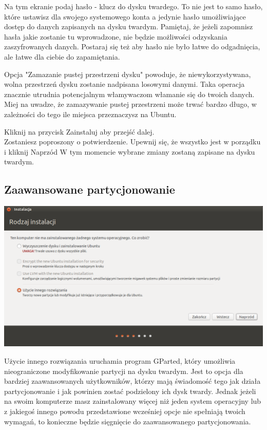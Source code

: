 Na tym ekranie podaj hasło - klucz do dysku twardego. To nie jest to samo hasło, które ustawisz dla swojego systemowego konta a jedynie hasło umożliwiające dostęp do danych zapisanych na dysku twardym. Pamiętaj, że jeżeli zapomnisz hasła jakie zostanie tu wprowadzone, nie będzie możliwości odzyskania zaszyfrowanych danych. Postaraj się też aby hasło nie było łatwe do odgadnięcia, ale łatwe dla ciebie do zapamiętania.

Opcja "Zamazanie pustej przestrzeni dysku" powoduje, że niewykorzystywana, wolna przestrzeń dysku zostanie nadpisana losowymi danymi. Taka operacja znacznie utrudnia potencjalnym włamywaczom włamanie się do twoich danych. Miej na uwadze, że zamazywanie pustej przestrzeni może trwać bardzo długo, w zależności do tego ile miejsca przeznaczysz na Ubuntu.
\begin{flushright}
Kliknij na przycisk \textcolor{ubuntu_orange}{Zainstaluj} aby przejść dalej.\\
Zostaniesz poproszony o potwierdzenie. Upewnij się, że wszystko jest w porządku i kliknij \textcolor{ubuntu_orange}{Naprzód}
W tym momencie wybrane zmiany zostaną zapisane na dysku twardym.\\
\end{flushright}
\clearpage
\subsection{Zaawansowane partycjonowanie}
\begin{center}
        \includegraphics[width=\linewidth]{images/instalator_partycjonowanie_gparted1.png}
\end{center}

\textcolor{ubuntu_orange}{Użycie innego rozwiązania} uruchamia program GParted, który umożliwia nieograniczone modyfikowanie partycji na dysku twardym. Jest to opcja dla bardziej zaawansowanych użytkowników, którzy mają świadomość tego jak działa partycjonowanie i jak powinien zostać podzielony ich dysk twardy. Jednak jeżeli na swoim komputerze masz zainstalowany więcej niż jeden system operacyjny lub z jakiegoś innego powodu przedstawione wcześniej opcje nie spełniają twoich wymagań, to konieczne będzie sięgnięcie do zaawansowanego partycjonowania.

